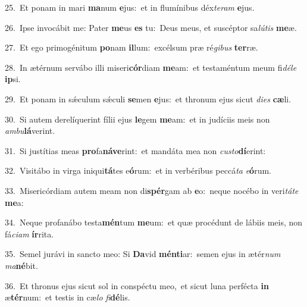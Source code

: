 {\numbfont\textcolor{\numbcolor}{25.}}~Et ponam in mari \textbf{ma}\-num \textbf{e}\-jus:~\star et in flumínibus déx\-\textit{te}\-\textit{ram} \textbf{e}\-jus.\par
{\numbfont\textcolor{\numbcolor}{26.}}~Ipse invocábit me: Pater \textbf{me}\-us \textbf{es} tu:~\star Deus meus, et suscéptor sa\-\textit{lú}\-\textit{tis} \textbf{me}\-æ.\par
{\numbfont\textcolor{\numbcolor}{27.}}~Et ego primogénitum \textbf{po}\-nam \textbf{il}\-lum:~\star excélsum præ ré\-\textit{gi}\-\textit{bus} \textbf{ter}\-ræ.\par
{\numbfont\textcolor{\numbcolor}{28.}}~In ætérnum servábo illi miseri\-\textbf{cór}\-diam \textbf{me}\-am:~\star et testaméntum meum fi\-\textit{dé}\-\textit{le} \textbf{ip}\-si.\par
{\numbfont\textcolor{\numbcolor}{29.}}~Et ponam in sǽculum sǽculi \textbf{se}\-men \textbf{e}\-jus:~\star et thronum ejus sicut \textit{di}\-\textit{es} \textbf{cæ}\-li.\par
{\numbfont\textcolor{\numbcolor}{30.}}~Si autem derelíquerint fílii ejus \textbf{le}\-gem \textbf{me}\-am:~\star et in judíciis meis non \textit{am}\-\textit{bu}\textbf{lá}verint.\par
{\numbfont\textcolor{\numbcolor}{31.}}~Si justítias meas \textbf{pro}\-fa\-\textbf{ná}\-\textbf{ve}rint:~\star et mandáta mea non \textit{cus}\-\textit{to}\textbf{dí}erint:\par
{\numbfont\textcolor{\numbcolor}{32.}}~Visitábo in virga iniqui\-\textbf{tá}\-tes e\-\textbf{ó}\-rum:~\star et in verbéribus peccá\textit{ta} \textit{e}\-\textbf{ó}rum.\par
{\numbfont\textcolor{\numbcolor}{33.}}~Misericórdiam autem meam non di\-\textbf{spér}\-gam ab \textbf{e}\-o:~\star neque nocébo in veri\-\textit{tá}\-\textit{te} \textbf{me}\-a:\par
{\numbfont\textcolor{\numbcolor}{34.}}~Neque profanábo testa\-\textbf{mén}\-tum \textbf{me}\-um:~\star et quæ procédunt de lábiis meis, non fá\-\textit{ci}\-\textit{am} \textbf{ír}\-rita.\par
{\numbfont\textcolor{\numbcolor}{35.}}~Semel jurávi in sancto meo: Si \textbf{Da}\-vid \textbf{mén}\-\textbf{ti}ar:~\star semen ejus in ætér\textit{num} \textit{ma}\-\textbf{né}bit.\par
{\numbfont\textcolor{\numbcolor}{36.}}~Et thronus ejus sicut sol in conspéctu meo,~\dagger et sicut luna perfécta \textbf{in} æ\-\textbf{tér}\-num:~\star et testis in cæ\textit{lo} \textit{fi}\-\textbf{dé}lis.\par
